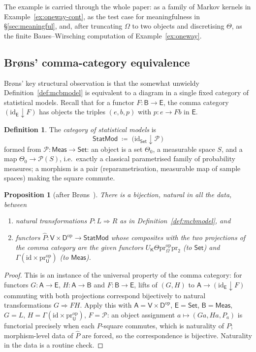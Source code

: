 \documentclass[11pt,a4paper]{article}
\theoremstyle{plain}
\newtheorem{proposition}[theorem]{Proposition}
\theoremstyle{definition}
\newtheorem{definition}[theorem]{Definition}
\theoremstyle{remark}
\newcommand{\cat}[1]{\mathsf{#1}}
\newcommand{\catU}{\cat{U}}
\newcommand{\catV}{\cat{V}}
\newcommand{\catO}{\cat{\Omega}}
\newcommand{\catD}{\cat{D}}
\newcommand{\catK}{\cat{K}}
\newcommand{\Meas}{\cat{Meas}}
\newcommand{\Set}{\cat{Set}}
\newcommand{\Prb}{\mathcal{P}}
\newcommand{\op}{\mathrm{op}}
\newcommand{\id}{\mathrm{id}}
\newcommand{\pr}{\mathrm{pr}}
\newcommand{\StatMod}{\cat{StatMod}}
\begin{document}
\medskip
\noindent The example is carried through the whole paper: as a family of
Markov kernels in Example~\ref{ex:oneway-cont}, as the test case for
meaningfulness in \S\ref{sec:meaningful}, and, after truncating $\catO$ to two
objects and discretising $\Theta$, as the finite Baues--Wirsching computation
of Example~\ref{ex:oneway}.

\subsection{Br\o ns' comma-category equivalence}

Br\o ns' key structural observation is that the somewhat unwieldy
Definition~\ref{def:mcbmodel} is equivalent to a diagram in a single fixed
category of statistical models. Recall that for a functor
$F \colon \cat{B} \to \cat{E}$, the comma category $(\id_{\cat E} \downarrow
F)$ has objects the triples $(e, b, p)$ with $p \colon e \to F b$ in
$\cat{E}$.

\begin{definition}\label{def:statmod}
The \emph{category of statistical models} is
\[
\StatMod \;\coloneqq\; \bigl(\id_{\Set} \downarrow \Prb\,\bigr)
\]
formed from $\Prb\colon\Meas\to\Set$: an object is a set $\Theta_0$, a
measurable space $S$, and a map $\Theta_0 \to \Prb(S)$, i.e.\ exactly a
classical parametrised family of probability measures; a morphism is a pair
(reparametrisation, measurable map of sample spaces) making the square
commute.
\end{definition}

\begin{proposition}[after Br\o ns~{\cite[pp.~1280,~1282]{brons_discussion_2002}}]\label{prop:brons}
There is a bijection, natural in all the data, between
\begin{enumerate}
\item natural transformations $P \colon L \Rightarrow R$ as in
Definition~\ref{def:mcbmodel}, and
\item functors $\widehat{P} \colon \catV \times \catD^{\op} \to \StatMod$
whose composites with the two projections of the comma category are the given
functors $U_\catK \Theta \pr_\catO^{\op}\pr_2$ (to $\Set$) and
$\Gamma(\id \times \pr_\catU^{\op})$ (to $\Meas$).
\end{enumerate}
\end{proposition}

\begin{proof}
This is an instance of the universal property of the comma category: for
functors $G \colon \cat{A} \to \cat{E}$, $H \colon \cat{A} \to \cat{B}$ and
$F \colon \cat{B} \to \cat{E}$, lifts of $(G,H)$ to
$\cat{A} \to (\id_{\cat E} \downarrow F)$ commuting with both projections
correspond bijectively to natural transformations $G \Rightarrow F H$. Apply
this with $\cat{A} = \catV \times \catD^{\op}$, $\cat{E}=\Set$,
$\cat{B}=\Meas$, $G = L$, $H = \Gamma(\id\times\pr_\catU^{\op})$, $F = \Prb$: an
object assignment $a \mapsto (G a, H a, P_a)$ is functorial precisely when
each $P$-square commutes, which is naturality of $P$; morphism-level data of
$\widehat P$ are forced, so the correspondence is bijective. Naturality in the
data is a routine check.
\end{proof}
\end{document}
